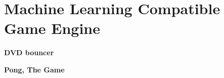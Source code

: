 \chapter*{Machine Learning Compatible Game Engine}



    \textbf{DVD bouncer}

    \textbf{Pong, The Game}




